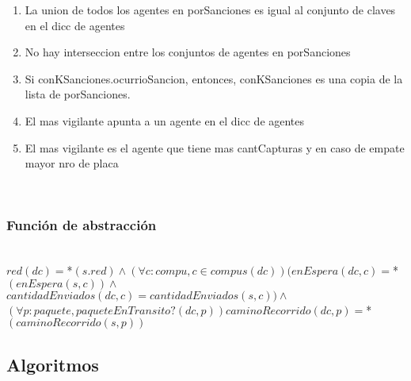 \begin{enumerate}
  \item La union de todos los agentes en porSanciones es igual al conjunto de claves en el dicc de agentes
  \item No hay interseccion entre los conjuntos de agentes en porSanciones
  \item Si conKSanciones.ocurrioSancion, entonces, conKSanciones es una copia de la lista de porSanciones.
  \item El mas vigilante apunta a un agente en el dicc de agentes
  \item El mas vigilante es el agente que tiene mas cantCapturas y en caso de empate mayor nro de placa
  
\end{enumerate}

  \\




\subsubsection*{Funci\'on de abstracción}

 \\
$red(dc)=$*$(s.red) \land (\forall c:compu, c\in compus(dc))( enEspera(dc,c)=$*$(enEspera(s,c)) \land$ \\
$  cantidadEnviados(dc,c)=cantidadEnviados(s,c)) \land $ \\ 
$(\forall p:paquete,paqueteEnTransito?(dc,p)) caminoRecorrido(dc,p)=$*$(caminoRecorrido(s,p)) $

\newpage

\subsection{Algoritmos}


